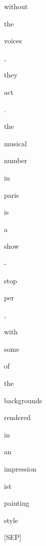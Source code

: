 \documentclass[varwidth=150mm]{standalone}
\begin{document}
\begin{CJK*}{UTF8}{gbsn}
{{{\colorbox{red!0.0}{\strut without} \colorbox{red!0.0}{\strut the} \colorbox{red!5.033134460449219}{\strut voices} \colorbox{red!0.0}{\strut ,} \colorbox{red!8.535990715026855}{\strut they} \colorbox{red!4.044565677642822}{\strut act} \colorbox{red!0.0}{\strut .} \colorbox{red!7.477057456970215}{\strut the} \colorbox{red!17.05777359008789}{\strut musical} \colorbox{red!11.033746719360352}{\strut number} \colorbox{red!8.264437675476074}{\strut in} \colorbox{red!34.57771682739258}{\strut paris} \colorbox{red!7.236667156219482}{\strut is} \colorbox{red!0.0}{\strut a} \colorbox{red!1.9420794248580933}{\strut show} \colorbox{red!2.805527448654175}{\strut -} \colorbox{red!0.0}{\strut stop}\colorbox{red!0.0}{\strut per} \colorbox{red!0.0}{\strut ,} \colorbox{red!2.999729871749878}{\strut with} \colorbox{red!1.925963044166565}{\strut some} \colorbox{red!0.0}{\strut of} \colorbox{red!1.7950546741485596}{\strut the} \colorbox{red!2.1852376461029053}{\strut backgrounds} \colorbox{red!1.0589439868927002}{\strut rendered} \colorbox{red!0.0}{\strut in} \colorbox{red!2.0180559158325195}{\strut an} \colorbox{red!4.169624328613281}{\strut impression}\colorbox{red!0.0}{\strut ist} \colorbox{red!1.558423399925232}{\strut painting} \colorbox{red!8.876387596130371}{\strut style} \colorbox{red!3.040656566619873}{\strut [SEP]}
}}}
\end{CJK*}
\end{document}
